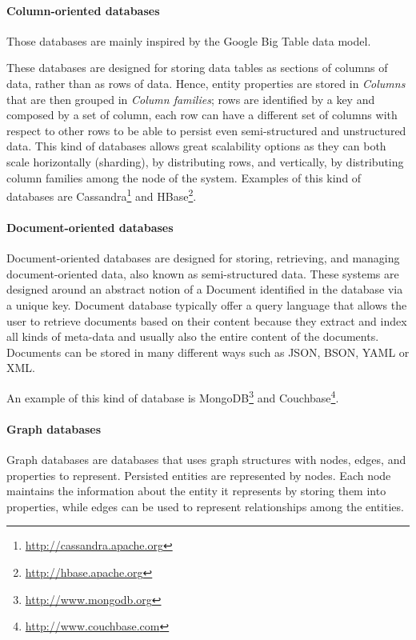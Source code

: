 \paragraph{Column-oriented databases}
Those databases are mainly inspired by the Google Big Table \cite{paper:bigtable} data model.

\noindent These databases are designed for storing data tables as sections of columns of data, rather than as rows of data. Hence, entity properties are stored in \textit{Columns} that are then grouped in \textit{Column families}; rows are identified by a key and composed by a set of column, each row can have a different set of columns with respect to other rows to be able to persist even semi-structured and unstructured data.
This kind of databases allows great scalability options as they can both scale horizontally (sharding), by distributing rows, and vertically, by distributing column families among the node of the system.
\noindent Examples of this kind of databases are Cassandra\footnote{\url{http://cassandra.apache.org}} and HBase\footnote{\url{http://hbase.apache.org}}.

\paragraph{Document-oriented databases}
Document-oriented databases are designed for storing, retrieving, and managing document-oriented data, also known as semi-structured data. 
These systems are designed around an abstract notion of a Document identified in the database via a unique key. 
Document database typically offer a query language that allows the user to retrieve documents based on their content because they extract and index all kinds of meta-data and usually also the entire content of the documents. 
Documents can be stored in many different ways such as JSON, BSON, YAML or XML.

\noindent An example of this kind of database is MongoDB\footnote{\url{http://www.mongodb.org}} and Couchbase\footnote{\url{http://www.couchbase.com}}.

\paragraph{Graph databases} 
Graph databases are databases that uses graph structures with nodes, edges, and properties to represent.
Persisted entities are represented by nodes. Each node maintains the information about the entity it represents by storing them into properties, while edges can be used to represent relationships among the entities.

